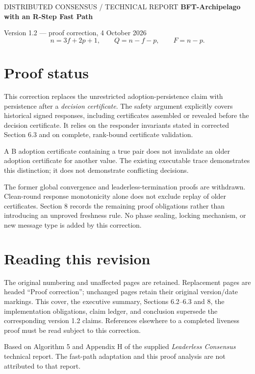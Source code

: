 \documentclass[11pt,a4paper]{article}
\newcommand{\page}[1]{\clearpage\setcounter{page}{#1}}
\begin{document}
\setcounter{page}{0}
\setlength{\emergencystretch}{1em}
\thispagestyle{empty}
{\small DISTRIBUTED CONSENSUS / TECHNICAL REPORT}
\vspace{15mm}
{\LARGE\bfseries BFT-Archipelago\\[4mm] with an R-Step Fast Path}
\vspace{8mm}

{\Large Version 1.2 --- proof correction, 4 October 2026}
\[
n=3f+2p+1,\qquad Q=n-f-p,\qquad F=n-p.
\]
\section*{Proof status}
This correction replaces the unrestricted adoption-persistence claim with persistence after a \emph{decision certificate}. The safety argument explicitly covers historical signed responses, including certificates assembled or revealed before the decision certificate. It relies on the responder invariants stated in corrected Section 6.3 and on complete, rank-bound certificate validation.

A B adoption certificate containing a true pair does not invalidate an older adoption certificate for another value. The existing executable trace demonstrates this distinction; it does not demonstrate conflicting decisions.

The former global convergence and leaderless-termination proofs are withdrawn. Clean-round response monotonicity alone does not exclude replay of older certificates. Section 8 records the remaining proof obligations rather than introducing an unproved freshness rule. No phase sealing, locking mechanism, or new message type is added by this correction.

\section*{Reading this revision}
The original numbering and unaffected pages are retained. Replacement pages are headed ``Proof correction''; unchanged pages retain their original version/date markings. This cover, the executive summary, Sections 6.2--6.3 and 8, the implementation obligations, claim ledger, and conclusion supersede the corresponding version 1.2 claims. References elsewhere to a completed liveness proof must be read subject to this correction.

Based on Algorithm 5 and Appendix H of the supplied \emph{Leaderless Consensus} technical report. The fast-path adaptation and this proof analysis are not attributed to that report.
\page{1}
\end{document}
